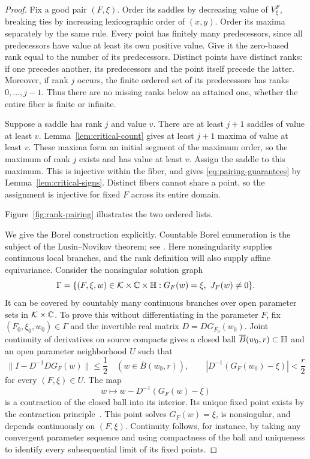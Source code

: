 \begin{proof}
Fix a good pair $(F,\xi)$.  Order its saddles by decreasing value of
$V^F_\xi$, breaking ties by increasing lexicographic order of $(x,y)$.
Order its maxima separately by the same rule.  Every point has finitely
many predecessors, since all predecessors have value at least its own
positive value.  Give it the zero-based rank equal to the number of its
predecessors.  Distinct points have distinct ranks: if one precedes
another, its predecessors and the point itself precede the latter.
Moreover, if rank $j$ occurs, the finite ordered set of its predecessors
has ranks $0,\ldots,j-1$.  Thus there are no missing ranks below an
attained one, whether the entire fiber is finite or infinite.

Suppose a saddle has rank $j$ and value $v$.  There are at least $j+1$
saddles of value at least $v$.  Lemma~\ref{lem:critical-count} gives at
least $j+1$ maxima of value at least $v$.  These maxima form an initial
segment of the maximum order, so the maximum of rank $j$ exists and has
value at least $v$.  Assign the saddle to this maximum.  This is
injective within the fiber, and gives \eqref{eq:pairing-guarantees} by
Lemma~\ref{lem:critical-signs}.  Distinct fibers cannot share a point,
so the assignment is injective for fixed $F$ across its entire domain.

Figure~\ref{fig:rank-pairing} illustrates the two ordered lists.


We give the Borel construction explicitly. Countable Borel enumeration
is the subject of the Lusin--Novikov theorem; see
\cite[4F.6 and 4F.17]{Moschovakis2009}. Here nonsingularity supplies
continuous local branches, and the rank definition will also supply
affine equivariance. Consider the nonsingular
solution graph
\[
 \Gamma=\{(F,\xi,w)\in\mathcal K\times\mathbb C\times\mathbb H:
                    G_F(w)=\xi,\ J_F(w)\ne0\}.
\]
It can be covered by countably many continuous branches over open
parameter sets in $\mathcal K\times\mathbb C$.  To prove this without differentiating
in the parameter $F$, fix $(F_0,\xi_0,w_0)\in\Gamma$ and the invertible
real matrix $D=DG_{F_0}(w_0)$.  Joint continuity of derivatives on source
compacts gives a closed ball $\overline B(w_0,r)\subset\mathbb H$ and an open
parameter neighborhood $U$ such that
\[
 \|I-D^{-1}DG_F(w)\|\le\frac12
 \quad(w\in\overline B(w_0,r)),\qquad
 |D^{-1}(G_F(w_0)-\xi)|<\frac r2
\]
for every $(F,\xi)\in U$.  The map
\[
 w\longmapsto w-D^{-1}(G_F(w)-\xi)
\]
is a contraction of the closed ball into its interior.  Its unique fixed
point exists by the contraction principle~\cite[Lemma~C.35]{Lee2013}.  This
point solves $G_F(w)=\xi$, is nonsingular, and depends continuously on
$(F,\xi)$.  Continuity follows, for instance, by taking any convergent
parameter sequence and using compactness of the ball and uniqueness to
identify every subsequential limit of its fixed points.


\end{proof}
